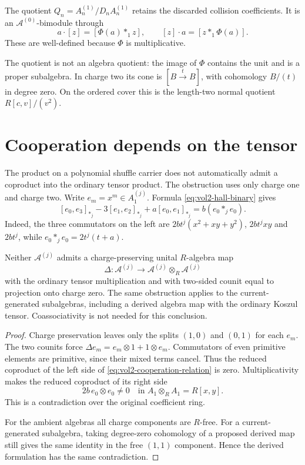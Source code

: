 The quotient
$Q_n=A_n^{(1)}/D_nA_n^{(1)}$ retains the discarded collision
coefficients.
It is an $\mathcal A^{(0)}$-bimodule through
\[
 a\cdot[z]=[\Phi(a)*_1z],\qquad
 [z]\cdot a=[z*_1\Phi(a)].
\]
These are well-defined because $\Phi$ is multiplicative.

The quotient is not an algebra quotient: the image of $\Phi$
contains the unit and is a proper subalgebra.
In charge two its cone is
$[B\xrightarrow{t}B]$, with cohomology $B/(t)$ in degree zero.
On the ordered cover this is the length-two normal quotient
$R[c,v]/(v^2)$.

\section{Cooperation depends on the tensor}

The product on a polynomial shuffle carrier does not automatically
admit a coproduct into the ordinary tensor product.
The obstruction uses only charge one and charge two.
Write $e_m=x^m\in A_1^{(j)}$.
Formula \eqref{eq:vol2-hall-binary} gives
\begin{equation}\label{eq:vol2-cooperation-relation}
 [e_0,e_3]_{*_j}-3[e_1,e_2]_{*_j}
       +a[e_0,e_1]_{*_j}
 =b(e_0*_je_0).
\end{equation}
Indeed, the three commutators on the left are
$2bt^j(x^2+xy+y^2)$, $2bt^jxy$ and $2bt^j$, while
$e_0*_je_0=2t^j(t+a)$.

\begin{theorem}\label{thm:vol2-shuffle-no-cooperation}
Neither $\mathcal A^{(j)}$ admits a charge-preserving unital
$R$-algebra map
\[
 \Delta:\mathcal A^{(j)}
       \longrightarrow\mathcal A^{(j)}\otimes_R\mathcal A^{(j)}
\]
with the ordinary tensor multiplication and with two-sided counit
equal to projection onto charge zero.
The same obstruction applies to the current-generated subalgebras,
including a derived algebra map with the ordinary Koszul tensor.
Coassociativity is not needed for this conclusion.
\end{theorem}
\begin{proof}
Charge preservation leaves only the splits $(1,0)$ and $(0,1)$
for each $e_m$.
The two counits force
$\Delta e_m=e_m\otimes1+1\otimes e_m$.
Commutators of even primitive elements are primitive, since their
mixed terms cancel.
Thus the reduced coproduct of the left side of
\eqref{eq:vol2-cooperation-relation} is zero.
Multiplicativity makes the reduced coproduct of its right side
\[
 2b\,e_0\otimes e_0\ne0
       \quad\text{in }A_1\otimes_R A_1=R[x,y].
\]
This is a contradiction over the original coefficient ring.

For the ambient algebras all charge components are $R$-free.
For a current-generated subalgebra, taking degree-zero cohomology
of a proposed derived map still gives the same identity in the
free $(1,1)$ component.
Hence the derived formulation has the same contradiction.
\end{proof}

